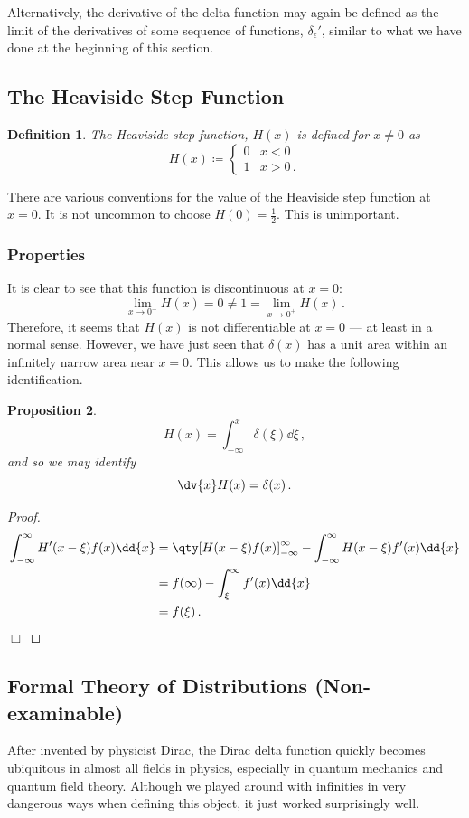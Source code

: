 \documentclass{article}
\theoremstyle{plain}\theoremheaderfont{\normalfont\itshape}\theorembodyfont{\rmfamily}\theoremseparator{.}\newtheorem*{rem}{Remark}\newtheorem*{ex}{Example}\newtheorem*{proof}{Proof}\newtheorem*{altp}{Alternative proof}
\theoremstyle{plain}\theoremheaderfont{\normalfont\bfseries}\theorembodyfont{\rmfamily}\theoremseparator{.}\newtheorem{thm}{Theorem}[section]\newtheorem{lem}[thm]{Lemma}\newtheorem{prop}[thm]{Proposition}\newtheorem*{cor}{Corollary}\newtheorem{defn}[thm]{Definition}\newtheorem{clm}[thm]{Claim}\newtheorem{clminproof}{Claim}
\theoremstyle{break}\theoremheaderfont{\normalfont\itshape}\theorembodyfont{\rmfamily}\theoremseparator{.\medskip}\newtheorem*{proofskip}{Proof}\newtheorem*{exs}{Examples}\newtheorem*{rems}{Remarks}
\theoremstyle{break}\theoremheaderfont{\normalfont\bfseries}\theorembodyfont{\rmfamily}\theoremseparator{.\medskip}\newtheorem{lemskip}[thm]{Lemma}\newtheorem{defnskip}[thm]{Definition}\newtheorem{propskip}[thm]{Proposition}\newtheorem{thmskip}[thm]{Theorem}
\numberwithin{equation}{section}
\newcommand{\qed}{\hfill\ensuremath{\Box}}
\begin{document}
	Alternatively, the derivative of the delta function may again be defined as the limit of the derivatives of some sequence of functions, \(\delta_\epsilon'\), similar to what we have done at the beginning of this section.
	\subsection{The Heaviside Step Function}
	\begin{defn}
		The \textit{Heaviside step function}, \(H(x)\) is defined for \(x\ne 0\) as
		\[H(x)\coloneqq\begin{cases}
			0 & x<0\\
			1 & x>0\,.
		\end{cases}\]
	\end{defn}
	There are various conventions for the value of the Heaviside step function at \(x=0\). It is not uncommon to choose \(H(0)=\frac{1}{2}\). This is unimportant.
	
	\subsubsection{Properties}
	It is clear to see that this function is discontinuous at \(x=0\):
	\[\lim_{x\to 0^-}H(x)=0\ne1=\lim_{x\to 0^+}H(x)\,.\]
	Therefore, it seems that \(H(x)\) is not differentiable at \(x=0\) --- at least in a normal sense. However, we have just seen that \(\delta(x)\) has a unit area within an infinitely narrow area near \(x=0\). This allows us to make the following identification.
	\begin{prop}
		\[H(x)=\int_{-\infty}^{x}\delta(\xi)\dd{\xi}\,,\]
		and so we may identify
		\[\dv{x} H(x)=\delta(x)\,.\]
	\end{prop}

	\begin{proof}
		\begin{align*}
			\int_{-\infty}^{\infty}H'(x-\xi)f(x)\dd{x}&=\qty[H(x-\xi)f(x)]^{\infty}_{-\infty}-\int_{-\infty}^{\infty}H(x-\xi)f'(x)\dd{x}\\
			&=f(\infty)-\int_{\xi}^{\infty}f'(x)\dd{x}\\
			&=f(\xi)\,.
		\end{align*}\qed
	\end{proof}

	\subsection{Formal Theory of Distributions (Non-examinable)}
	After invented by physicist Dirac, the Dirac delta function quickly becomes ubiquitous in almost all fields in physics, especially in quantum mechanics and quantum field theory. Although we played around with infinities in very dangerous ways when defining this object, it just worked surprisingly well.
\end{document}
